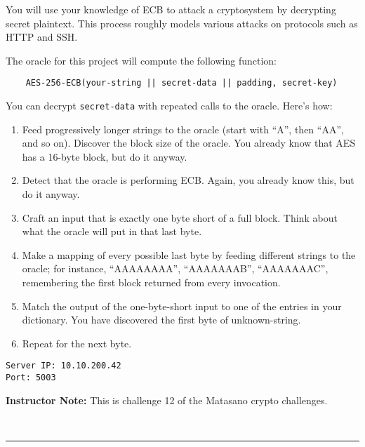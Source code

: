 \documentclass[11pt,oneside]{article}
\newcommand{\sectionfont}{phv} %
\renewcommand{\section}[1] {
    \vspace{12pt}{\quad\fontfamily{\sectionfont}\selectfont\Large\scshape\textbf{#1}}\\[-10pt]
    \vspace{8pt}\rule{\textwidth}{1pt}\\[-16pt]

}
\begin{document}
You will use your knowledge of ECB to attack a cryptosystem by decrypting secret
plaintext. This process roughly models various attacks on protocols such as HTTP
and SSH.

The oracle for this project will compute the following function:

\begin{lstlisting}
    AES-256-ECB(your-string || secret-data || padding, secret-key)
\end{lstlisting}

You can decrypt \texttt{secret-data} with repeated calls to the oracle. Here's
how:

\begin{enumerate}
	\item Feed progressively longer strings to the oracle (start with ``A'',
		then ``AA'', and so on). Discover the block size of the oracle. You
		already know that AES has a 16-byte block, but do it anyway.
	
	\item Detect that the oracle is performing ECB. Again, you already know
		this, but do it anyway.
	
	\item Craft an input that is exactly one byte short of a full block. Think
		about what the oracle will put in that last byte.

	\item Make a mapping of every possible last byte by feeding different
		strings to the oracle; for instance, ``AAAAAAAA'', ``AAAAAAAB'',
		``AAAAAAAC'', remembering the first block returned from every
		invocation.
	
	\item Match the output of the one-byte-short input to one of the entries in
		your dictionary. You have discovered the first byte of unknown-string.
	
	\item Repeat for the next byte.
\end{enumerate}

\begin{verbatim}
Server IP: 10.10.200.42
Port: 5003
\end{verbatim}

\ifinstructornotes
\textbf{Instructor Note:} This is challenge 12 of the Matasano crypto
challenges.
\fi

\section{Rules}
\end{document}
